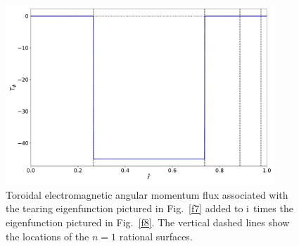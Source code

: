 \documentclass[12pt,prb,aps]{revtex4-1}
\begin{document}
\begin{figure}
\centerline{\includegraphics[width=0.9\textwidth]{Figure9.pdf}}
\caption{Toroidal electromagnetic  angular momentum flux associated with the tearing eigenfunction
pictured in Fig.~\ref{f7} added to ${\rm i}$ times the eigenfunction pictured in Fig.~\ref{f8}.  The vertical dashed lines show
the locations of the $n=1$ rational surfaces.  }\label{f9}
\end{figure}
\end{document}
